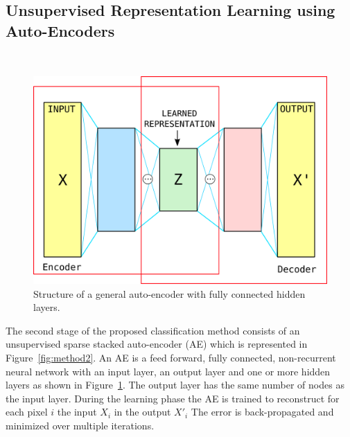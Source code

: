 


\subsection{Unsupervised Representation Learning using Auto-Encoders} ~\label{sec:stage2}





\begin{figure}[t]
\centering
	\includegraphics[width = 0.6\columnwidth]{Figures/Trento/AE}
	\caption[Schematic Diagram of an AE]{ Structure of a general auto-encoder with fully connected hidden layers. }
	\label{fig:AE}
\end{figure}

The second stage of the proposed classification method consists of an unsupervised sparse stacked auto-encoder (AE) which is represented in Figure~\ref{fig:method2}. An AE is a feed forward, fully connected, non-recurrent neural network with an input layer, an output layer and one or more hidden layers as shown in Figure~\ref{fig:AE}. 
The output layer has the same number of nodes as the input layer. During the learning phase the AE is trained to reconstruct for each pixel $i$ the input $X_i$ in the output $X'_i$
The error is back-propagated and minimized over multiple iterations. 

